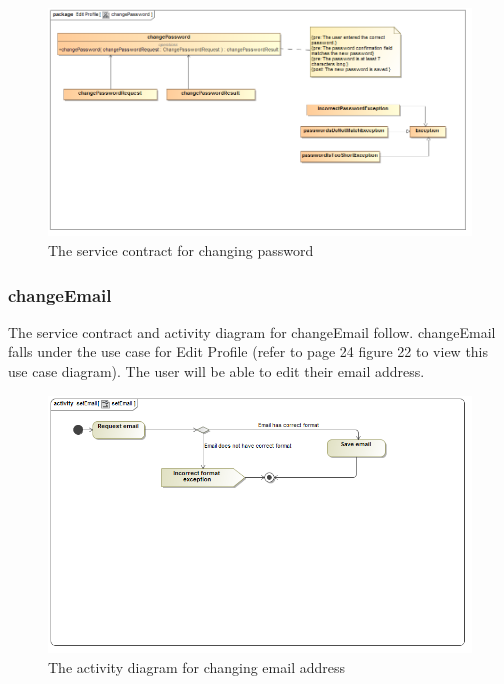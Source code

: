 \documentclass[a4paper,12pt]{article}
\begin{document}
\begin{figure}[H]
	\centering
	\includegraphics[width=1.0\textwidth]{../Diagrams/ManageProfile/serviceContracts/changePasswordServiceContract.png}
	\caption{The service contract for changing password}
\end{figure}

\subsubsection{changeEmail}
The service contract and activity diagram for changeEmail follow. changeEmail falls under the use case for Edit Profile (refer to page 24 figure 22 to view this use case diagram). The user will be able to edit their email address.
\begin{figure}[H]
  \centering
    \includegraphics[width=1.0\textwidth]{../Diagrams/ManageProfile/ActivityDiagrams/setEmail1.png} 
    \caption{The activity diagram for changing email address}
\end{figure}
	
\end{document}
